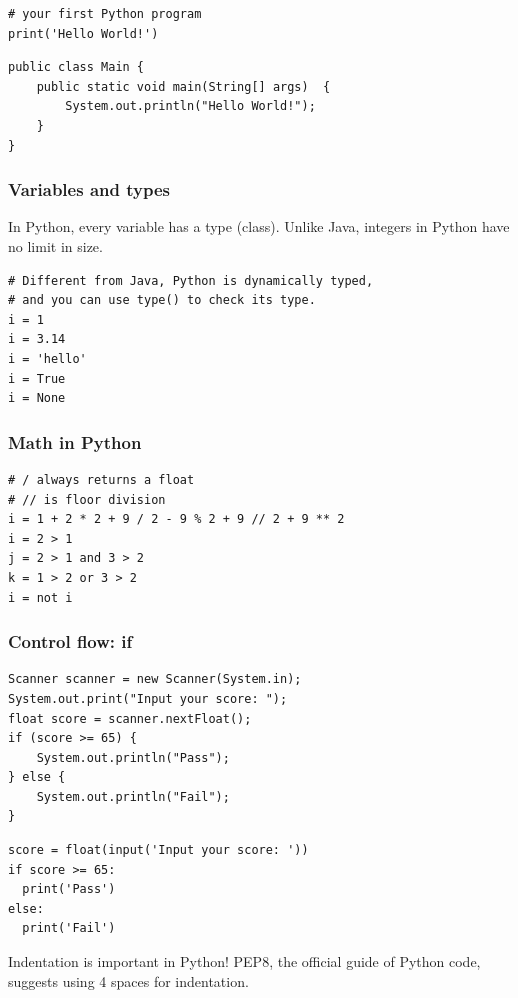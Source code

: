 \documentclass[aspectratio=169, 14pt]{beamer}
\begin{document}
\begin{frame}[fragile]

	\begin{verbatim}
# your first Python program
print('Hello World!')
  \end{verbatim}

	\begin{verbatim}
public class Main {
    public static void main(String[] args)  {
        System.out.println("Hello World!");
    }
}
  \end{verbatim}
\end{frame}

\begin{frame}[fragile]
	\frametitle{Variables and types}
	In Python, every variable has a type (class). Unlike Java, integers in Python have no limit in size.
	\begin{verbatim}
# Different from Java, Python is dynamically typed,
# and you can use type() to check its type.
i = 1 
i = 3.14
i = 'hello'
i = True
i = None
  \end{verbatim}

\end{frame}

\begin{frame}[fragile]
	\frametitle{Math in Python}

	\begin{verbatim}
# / always returns a float
# // is floor division
i = 1 + 2 * 2 + 9 / 2 - 9 % 2 + 9 // 2 + 9 ** 2
i = 2 > 1
j = 2 > 1 and 3 > 2
k = 1 > 2 or 3 > 2
i = not i
  \end{verbatim}
\end{frame}

\begin{frame}[fragile]
	\frametitle{Control flow: if}
	\begin{verbatim}
Scanner scanner = new Scanner(System.in);
System.out.print("Input your score: ");
float score = scanner.nextFloat();
if (score >= 65) {
    System.out.println("Pass");
} else {
    System.out.println("Fail");
}
\end{verbatim}
\end{frame}

\begin{frame}[fragile]

	\begin{verbatim}
score = float(input('Input your score: '))
if score >= 65:
  print('Pass')
else:
  print('Fail')
  \end{verbatim}
	\alert{Indentation} is important in Python! PEP8, the official guide of Python code, suggests using \alert{4 spaces} for indentation.
\end{frame}
\end{document}
